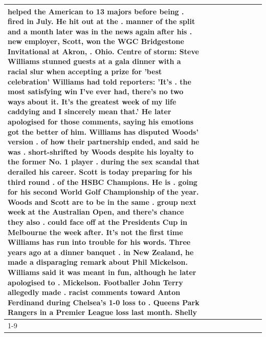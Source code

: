 \begin{table}[H]
\begin{tabular}{lllrlllll}
helped the American to 13 majors before being . fired in July. He hit out at the . manner of the split and a month later was in the news again after his . new employer, Scott, won the WGC Bridgestone Invitational at Akron, . Ohio. Centre of storm: Steve Williams stunned guests at a gala dinner with a racial slur when accepting a prize for 'best celebration' Williams had told reporters: 'It's . the most satisfying win I've ever had, there's no two ways about it. It's the greatest week of my life caddying and I sincerely mean that.' He later apologised for those comments, saying his emotions got the better of him. Williams has disputed Woods' version . of how their partnership ended, and said he was . short-shrifted by Woods despite his loyalty to the former No. 1 player . during the sex scandal that derailed his career. Scott is today preparing for his third round . of the HSBC Champions. He is . going for his second World Golf Championship of the year. Woods and Scott are to be in the same . group next week at the Australian Open, and there's chance they also . could face off at the Presidents Cup in Melbourne the week after. It's not the first time Williams has run into trouble for his words. Three years ago at a dinner banquet . in New Zealand, he made a disparaging remark about Phil Mickelson. Williams said it was meant in fun, although he later apologised to . Mickelson. Footballer John Terry allegedly made . racist comments toward Anton Ferdinand during Chelsea's 1-0 loss to . Queens Park Rangers in a Premier League loss last month. Shelly \\
\cline{1-9}

\end{tabular}
\end{table}

